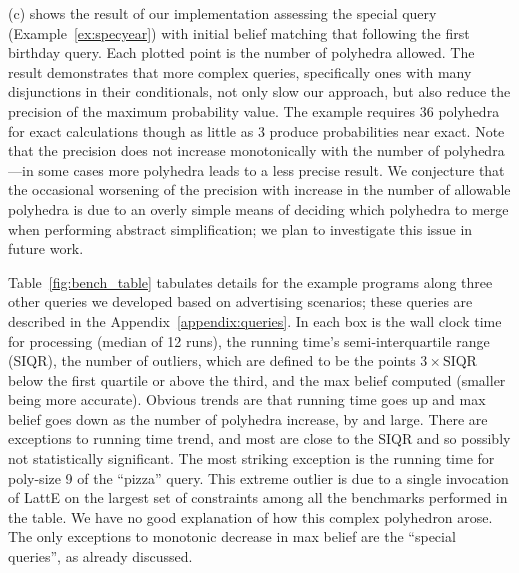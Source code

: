 \else
{}(c) shows the result of our implementation
assessing the special query (Example~\ref{ex:specyear}) with initial
belief matching that following the first birthday query.  Each plotted
point is the number of polyhedra allowed.  The result demonstrates
that more complex queries, specifically ones with many disjunctions in
their conditionals, not only slow our approach, but also reduce the
precision of the maximum probability value. The example requires 36
polyhedra for exact calculations though as little as 3 produce
probabilities near exact. Note that the precision does not increase
monotonically with the number of polyhedra---in some cases more
polyhedra leads to a less precise result.  We conjecture
that the occasional worsening of the precision with increase in the
number of allowable polyhedra is due to an overly simple means of
deciding which polyhedra to merge when performing abstract
simplification; we plan to investigate this issue in future work.
\fi

\iffull

Table~\ref{fig:bench_table} tabulates details for the example programs
along three other queries we developed based on advertising scenarios;
these queries are described in the Appendix~\ref{appendix:queries}. In
each box is the wall clock time for processing (median of 12 runs),
the running time's semi-interquartile range (SIQR), the number of
outliers, which are defined to be the points $ 3\times\text{SIQR} $
below the first quartile or above the third, and the max belief
computed (smaller being more accurate).  Obvious trends are that
running time goes up and max belief goes down as the number of
polyhedra increase, by and large.  There are exceptions to running
time trend, and most are close to the SIQR and so possibly not
statistically significant. The most striking exception is the running
time for poly-size 9 of the ``pizza'' query.  This extreme outlier is
due to a single invocation of LattE on the largest set of constraints
among all the benchmarks performed in the table. We have no good
explanation of how this complex polyhedron arose.  The only
exceptions to monotonic decrease in max belief are the ``special
queries'', as already discussed.   


